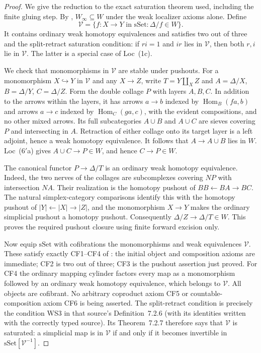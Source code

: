 \begin{proof}
We give the reduction to the exact saturation theorem used, including the
finite gluing step.  By \citet[Theorem~6.1.18]{Cisinski2006B},
$W_\infty\subseteq W$ under the weak localizer axioms alone.  Define
\[
 \mathcal V=\{f:X\to Y\text{ in }\mathrm{sSet}:\Delta/f\in W\}.
\]
It contains ordinary weak homotopy equivalences and satisfies two out of
three and the split-retract saturation condition: if $ri=1$ and $ir$ lies
in $\mathcal V$, then both $r,i$ lie in $\mathcal V$.  The latter is a
special case of Loc~(1c).

We check that monomorphisms in $\mathcal V$ are stable under pushouts.
For a monomorphism $X\hookrightarrow Y$ in $\mathcal V$ and any $X\to Z$,
write $T=Y\amalg_X Z$ and
$A=\Delta/X$, $B=\Delta/Y$, $C=\Delta/Z$.
Form the double collage $P$ with layers $A,B,C$.  In addition to the
arrows within the layers, it has arrows $a\to b$ indexed by
$\operatorname{Hom}_B(fa,b)$ and arrows $a\to c$ indexed by
$\operatorname{Hom}_C(ga,c)$, with the evident compositions, and no other
mixed arrows.  Its full subcategories $A\cup B$ and $A\cup C$ are sieves
covering $P$ and intersecting in $A$.  Retraction of either collage onto
its target layer is a left adjoint, hence a weak homotopy equivalence.
It follows that $A\to A\cup B$ lies in $W$.  Loc~($6'$a) gives
$A\cup C\to P\in W$, and hence $C\to P\in W$.

The canonical functor $P\to\Delta/T$ is an ordinary weak homotopy
equivalence.  Indeed, the two nerves of the collages are subcomplexes
covering $NP$ with intersection $NA$.  Their realization is the homotopy
pushout of $BB\leftarrow BA\to BC$.  The natural simplex-category
comparisons identify this with the homotopy pushout of
$|Y|\leftarrow|X|\to|Z|$, and the monomorphism $X\to Y$ makes the ordinary
simplicial pushout a homotopy pushout.  Consequently
$\Delta/Z\to\Delta/T\in W$.  This proves the required pushout closure
using finite forward excision only.

Now equip $\mathrm{sSet}$ with cofibrations the monomorphisms and weak
equivalences $\mathcal V$.  These satisfy exactly CF1--CF4 of
\citet[Definition~1.1.1]{RadulescuBanu2009}: the initial object and
composition axioms are immediate; CF2 is two out of three; CF3 is the
pushout assertion just proved.  For CF4 the ordinary mapping cylinder
factors every map as a monomorphism followed by an ordinary weak homotopy
equivalence, which belongs to $\mathcal V$.  All objects are cofibrant.
No arbitrary coproduct axiom CF5 or countable-composition axiom CF6 is
being asserted.  The split-retract condition is precisely the condition
WS3 in that source's Definition~7.2.6 (with its identities written with
the correctly typed source).  Its Theorem~7.2.7 therefore says that
$\mathcal V$ is saturated: a simplicial map is in $\mathcal V$ if and
only if it becomes invertible in
$\mathrm{sSet}[\mathcal V^{-1}]$.


\end{proof}
